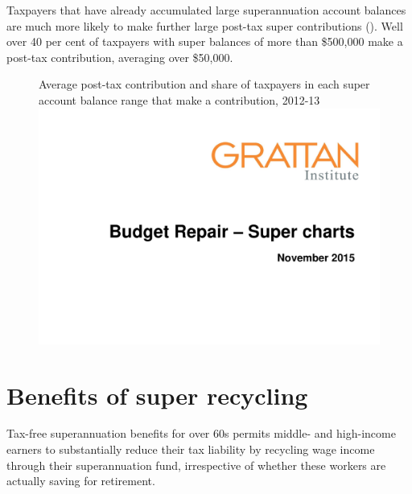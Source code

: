 \begin{subappendices}
\begin{figure}

\end{figure}
Taxpayers that have already accumulated large superannuation account balances are much more likely to make further large post-tax super contributions (). Well over 40 per cent of taxpayers with super balances of more than \$500,000 make a post-tax contribution, averaging over \$50,000.

\begin{figure}
%
{Average post-tax contribution and share of taxpayers in each super account balance range that make a contribution, 2012-13}%
\includegraphics[width=\columnwidth,page=47]{super-atlas/PPTX.pdf}

\end{figure}


\chapter{Benefits of super recycling}\label{appendix:SUPER-B}
Tax-free superannuation benefits for over 60s permits middle- and high-income earners to substantially reduce their tax liability by recycling wage income through their superannuation fund, irrespective of whether these workers are actually saving for retirement.


\end{subappendices}
